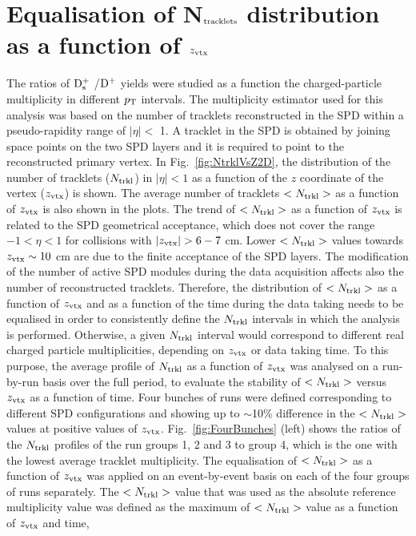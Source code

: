 \section{Equalisation of N$_{\rm tracklets}$ distribution as a function of $z_{\rm vtx}$}
\label{sec:zVxtEq}
The ratios of ${\rm D_s^+}$ /${\rm D^+}$ yields were studied as a 
function the charged-particle multiplicity in different $p_{\rm T}$ intervals.
The multiplicity estimator used for this analysis was based on the number 
of tracklets reconstructed in the SPD within a 
pseudo-rapidity range of $|\eta| <$ 1. A tracklet in the SPD is obtained by
joining space points on the two SPD layers and it is required to point to 
the reconstructed primary vertex. 
In Fig.~\ref{fig:NtrklVsZ2D}, the distribution of the number of tracklets ($N_{\rm trkl}$) in $|\eta|<1$ as a function
of the $z$ coordinate of the vertex ($z_{\rm vtx}$) is shown.
 The average number of tracklets $<N_{\rm trkl}>$ as a function of $z_{\rm vtx}$ is also shown in the plots.
 The trend of $<N_{\rm trkl}>$ as a function of $z_{\rm vtx}$ is related to the SPD geometrical acceptance,
 which does not cover the range $-1 < \eta < 1$ for collisions with $|\zVtx|> 6-7$ cm.
 Lower $<N_{\rm trkl}>$ values towards $z_{\rm vtx} \sim 10 $ cm are due to the 
 finite acceptance of the SPD layers. 
The modification of the number of active SPD modules during the data acquisition 
 affects also the number of reconstructed tracklets.
 Therefore, the distribution of $<N_{\rm trkl}>$ as a function of $z_{\rm vtx}$ and as a function of the time
 during the data taking needs to be equalised 
in order to consistently define the $N_{\rm trkl}$ intervals in which the analysis is performed.
Otherwise, a given $N_{\rm trkl}$ interval would correspond to different real charged particle
multiplicities, depending on $z_{\rm vtx}$ or data taking time.
To this purpose, the average profile of $N_{\rm trkl}$ as a function of $z_{\rm vtx}$ was analysed on a run-by-run basis 
over the full period, to evaluate the stability of $<N_{\rm trkl}>$ versus $z_{\rm vtx}$ 
as a function of time. Four bunches of runs were defined corresponding to different SPD
configurations and showing up to $\sim$10\% difference in the $<N_{\rm trkl}>$ values at positive values 
of $z_{\rm vtx}$. Fig.~\ref{fig:FourBunches} (left) shows the ratios of the $N_{\rm trkl}$ profiles
of the run groups 1, 2 and 3 to group 4, which is the one with the lowest average tracklet multiplicity.
 The equalisation of $<N_{\rm trkl}>$ as a function of $z_{\rm vtx}$ was applied on an 
 event-by-event basis on each of the four groups of runs separately.
The $<N_{\rm trkl}>$ value that was used as the absolute reference multiplicity 
value was defined as the maximum of $<N_{\rm trkl}>$ value as a function of $z_{\rm vtx}$ and time,
